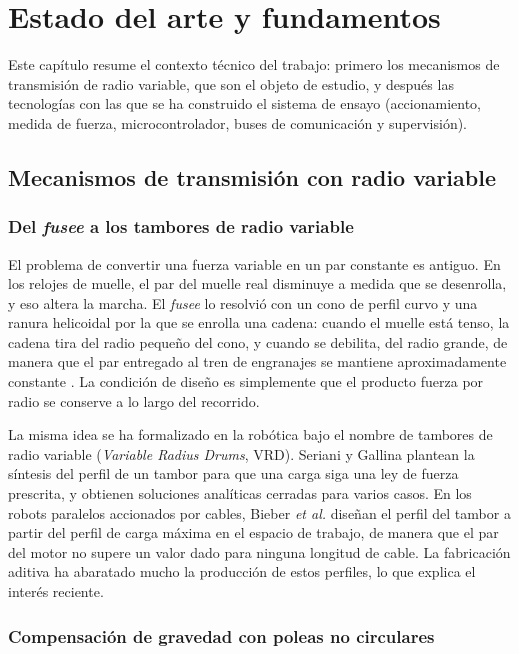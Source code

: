\chapter{Estado del arte y fundamentos}
\label{chap:estado}

Este capítulo resume el contexto técnico del trabajo: primero los mecanismos de transmisión de
radio variable, que son el objeto de estudio, y después las tecnologías con las que se ha
construido el sistema de ensayo (accionamiento, medida de fuerza, microcontrolador, buses de
comunicación y supervisión).

\section{Mecanismos de transmisión con radio variable}

\subsection{Del \emph{fusee} a los tambores de radio variable}

El problema de convertir una fuerza variable en un par constante es antiguo. En los relojes de
muelle, el par del muelle real disminuye a medida que se desenrolla, y eso altera la marcha. El
\emph{fusee} lo resolvió con un cono de perfil curvo y una ranura helicoidal por la que se enrolla
una cadena: cuando el muelle está tenso, la cadena tira del radio pequeño del cono, y cuando se
debilita, del radio grande, de manera que el par entregado al tren de engranajes se mantiene
aproximadamente constante \cite{landes1983}. La condición de diseño es simplemente que el producto
fuerza por radio se conserve a lo largo del recorrido.

La misma idea se ha formalizado en la robótica bajo el nombre de tambores de radio variable
(\emph{Variable Radius Drums}, VRD). Seriani y Gallina \cite{seriani2016} plantean la síntesis del
perfil de un tambor para que una carga siga una ley de fuerza prescrita, y obtienen soluciones
analíticas cerradas para varios casos. En los robots paralelos accionados por cables, Bieber
\emph{et al.} \cite{bieber2023} diseñan el perfil del tambor a partir del perfil de carga máxima en
el espacio de trabajo, de manera que el par del motor no supere un valor dado para ninguna longitud
de cable. La fabricación aditiva ha abaratado mucho la producción de estos perfiles, lo que explica
el interés reciente.

\subsection{Compensación de gravedad con poleas no circulares}

